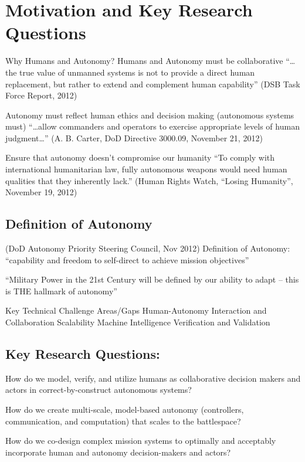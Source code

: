 
\section*{Motivation and Key Research Questions}

Why Humans and Autonomy?
Humans and Autonomy must be collaborative
“…the true value of unmanned systems is not to provide a direct human replacement, but rather to extend and complement human capability” (DSB Task Force Report, 2012)

Autonomy must reflect human ethics and decision making
(autonomous systems must) “…allow commanders and operators to exercise appropriate levels of human judgment…” (A. B. Carter, DoD Directive 3000.09, November 21, 2012)

Ensure that autonomy doesn’t compromise our humanity
“To comply with international humanitarian law, fully autonomous weapons would need human qualities that they inherently lack.” (Human Rights Watch, “Losing Humanity”, November 19, 2012)

\subsection*{Definition of Autonomy}
(DoD Autonomy Priority Steering Council, Nov 2012)
Definition of Autonomy: “capability and freedom to self-direct to achieve mission objectives”

“Military Power in the 21st Century will be defined by our ability to adapt – this is THE hallmark of autonomy”

Key Technical Challenge Areas/Gaps
Human-Autonomy Interaction and Collaboration
Scalability
Machine Intelligence
Verification and Validation

\subsection*{Key Research Questions:}

How do we model, verify, and utilize humans as collaborative decision makers and actors in correct-by-construct autonomous systems?

How do we create multi-scale, model-based autonomy (controllers, communication, and computation) that scales to the battlespace?

How do we co-design complex mission systems to optimally and acceptably incorporate human and autonomy decision-makers and actors?


